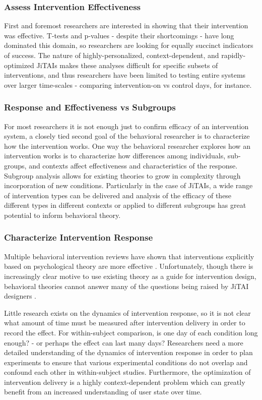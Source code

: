 \subsubsection{Assess Intervention Effectiveness}
First and foremost researchers are interested in showing that their intervention was effective.
T-tests and p-values - despite their shortcomings \cite{nuzzo2014} - have long dominated this domain, so researchers are looking for equally succinct indicators of success.
The nature of highly-personalized, context-dependent, and rapidly-optimized JiTAIs makes these analyses difficult for specific subsets of interventions, and thus researchers have been limited to testing entire systems over larger time-scales - comparing intervention-on vs control days, for instance.

\subsubsection{Response and Effectiveness vs Subgroups}
For most researchers it is not enough just to confirm efficacy of an intervention system, a closely tied second goal of the behavioral researcher is to characterize how the intervention works.
One way the behavioral researcher explores how an intervention works is to characterize how differences among individuals, sub-groups, and contexts affect effectiveness and characteristics of the response.
Subgroup analysis allows for existing theories to grow in complexity through incorporation of new conditions.
Particularly in the case of JiTAIs, a wide range of intervention types can be delivered and analysis of the efficacy of these different types in different contexts or applied to different subgroups has great potential to inform behavioral theory.


\subsubsection{Characterize Intervention Response}
Multiple behavioral intervention reviews have shown that interventions explicitly based on psychological theory are more effective \cite{glanz2010}.
Unfortunately, though there is increasingly clear motive to use existing theory as a guide for intervention design, behavioral theories cannot answer many of the questions being raised by JiTAI designers \cite{riley2011}.

Little research exists on the dynamics of intervention response, so it is not clear what amount of time must be measured after intervention delivery in order to record the effect.
For within-subject comparison, is one day of each condition long enough? - or perhaps the effect can last many days?
Researchers need a more detailed understanding of the dynamics of intervention response in order to plan experiments to ensure that various experimental conditions do not overlap and confound each other in within-subject studies.
Furthermore, the optimization of intervention delivery is a highly context-dependent problem which can greatly benefit from an increased understanding of user state over time.

